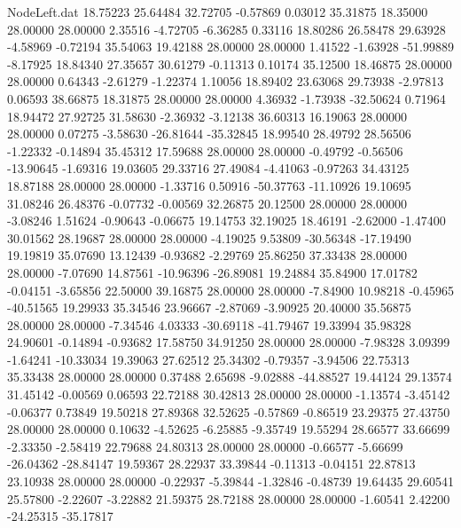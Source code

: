\begin{filecontents}{NodeLeft.dat}
  18.75223   25.64484   32.72705    -0.57869    0.03012   35.31875   18.35000   28.00000   28.00000    2.35516   -4.72705   -6.36285    0.33116
  18.80286   26.58478   29.63928    -4.58969   -0.72194   35.54063   19.42188   28.00000   28.00000    1.41522   -1.63928  -51.99889   -8.17925
  18.84340   27.35657   30.61279    -0.11313    0.10174   35.12500   18.46875   28.00000   28.00000    0.64343   -2.61279   -1.22374    1.10056
  18.89402   23.63068   29.73938    -2.97813    0.06593   38.66875   18.31875   28.00000   28.00000    4.36932   -1.73938  -32.50624    0.71964
  18.94472   27.92725   31.58630    -2.36932   -3.12138   36.60313   16.19063   28.00000   28.00000    0.07275   -3.58630  -26.81644  -35.32845
  18.99540   28.49792   28.56506    -1.22332   -0.14894   35.45312   17.59688   28.00000   28.00000   -0.49792   -0.56506  -13.90645   -1.69316
  19.03605   29.33716   27.49084    -4.41063   -0.97263   34.43125   18.87188   28.00000   28.00000   -1.33716    0.50916  -50.37763  -11.10926
  19.10695   31.08246   26.48376    -0.07732   -0.00569   32.26875   20.12500   28.00000   28.00000   -3.08246    1.51624   -0.90643   -0.06675
  19.14753   32.19025   18.46191    -2.62000   -1.47400   30.01562   28.19687   28.00000   28.00000   -4.19025    9.53809  -30.56348  -17.19490
  19.19819   35.07690   13.12439    -0.93682   -2.29769   25.86250   37.33438   28.00000   28.00000   -7.07690   14.87561  -10.96396  -26.89081
  19.24884   35.84900   17.01782    -0.04151   -3.65856   22.50000   39.16875   28.00000   28.00000   -7.84900   10.98218   -0.45965  -40.51565
  19.29933   35.34546   23.96667    -2.87069   -3.90925   20.40000   35.56875   28.00000   28.00000   -7.34546    4.03333  -30.69118  -41.79467
  19.33994   35.98328   24.90601    -0.14894   -0.93682   17.58750   34.91250   28.00000   28.00000   -7.98328    3.09399   -1.64241  -10.33034
  19.39063   27.62512   25.34302    -0.79357   -3.94506   22.75313   35.33438   28.00000   28.00000    0.37488    2.65698   -9.02888  -44.88527
  19.44124   29.13574   31.45142    -0.00569    0.06593   22.72188   30.42813   28.00000   28.00000   -1.13574   -3.45142   -0.06377    0.73849
  19.50218   27.89368   32.52625    -0.57869   -0.86519   23.29375   27.43750   28.00000   28.00000    0.10632   -4.52625   -6.25885   -9.35749
  19.55294   28.66577   33.66699    -2.33350   -2.58419   22.79688   24.80313   28.00000   28.00000   -0.66577   -5.66699  -26.04362  -28.84147
  19.59367   28.22937   33.39844    -0.11313   -0.04151   22.87813   23.10938   28.00000   28.00000   -0.22937   -5.39844   -1.32846   -0.48739
  19.64435   29.60541   25.57800    -2.22607   -3.22882   21.59375   28.72188   28.00000   28.00000   -1.60541    2.42200  -24.25315  -35.17817

\end{filecontents}
